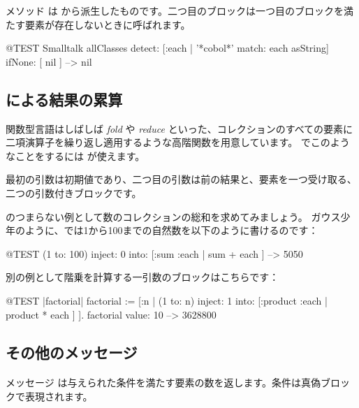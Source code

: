 \documentclass[a4paper,10pt,twoside]{book}
\begin{document}

メソッド  は  から派生したものです。二つ目のブロックは一つ目のブロックを満たす要素が存在しないときに呼ばれます。

\begin{code}{@TEST}
Smalltalk allClasses detect: [:each | '*cobol*' match: each asString] ifNone: [ nil ] --> nil
\end{code}

\subsection{ による結果の累算}
関数型言語はしばしば \emph{fold} や \emph{reduce} といった、コレクションのすべての要素に二項演算子を繰り返し適用するような高階関数を用意しています。
\pharo でこのようなことをするには  が使えます。

最初の引数は初期値であり、二つ目の引数は前の結果と、要素を一つ受け取る、二つの引数付きブロックです。

 のつまらない例として数のコレクションの総和を求めてみましょう。
ガウス少年のように、\pharo では1から100までの自然数を以下のように書けるのです：
\begin{code}{@TEST}
(1 to: 100) inject: 0 into: [:sum :each | sum + each ] --> 5050
\end{code}

別の例として階乗を計算する一引数のブロックはこちらです：
\begin{code}{@TEST |factorial|}
factorial := [:n | (1 to: n) inject: 1 into: [:product :each | product * each ] ].
factorial value: 10 --> 3628800
\end{code}

\subsection{その他のメッセージ}

\paragraph{} メッセージ  は与えられた条件を満たす要素の数を返します。条件は真偽ブロックで表現されます。
\end{document}
